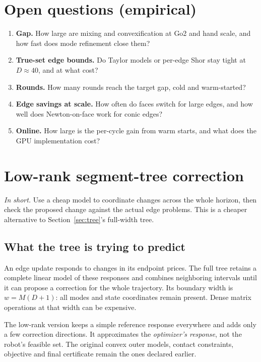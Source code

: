 \documentclass[11pt]{article}
\theoremstyle{plain}
\theoremstyle{definition}
\theoremstyle{remark}
\begin{document}
\section{Open questions (empirical)}
\begin{enumerate}[label=\textbf{Q\arabic*.},leftmargin=2em]
  \item \textbf{Gap.} How large are mixing and convexification at Go2 and hand scale, and how fast does mode refinement close them?
  \item \textbf{True-set edge bounds.} Do Taylor models or per-edge Shor stay tight at $D\approx40$, and at what cost?
  \item \textbf{Rounds.} How many rounds reach the target gap, cold and warm-started?
  \item \textbf{Edge savings at scale.} How often do faces switch for large edges, and how well does Newton-on-face work for conic edges?
  \item \textbf{Online.} How large is the per-cycle gain from warm starts, and what does the GPU implementation cost?
\end{enumerate}

\section{Low-rank segment-tree correction}\label{sec:lowrank}
\textit{In short.} Use a cheap model to coordinate changes across the whole horizon, then check the proposed change against the actual edge problems. This is a cheaper alternative to Section~\ref{sec:tree}'s full-width tree.

\subsection{What the tree is trying to predict}
An edge update responds to changes in its endpoint prices. The full tree retains a complete linear model of these responses and combines neighboring intervals until it can propose a correction for the whole trajectory. Its boundary width is $w=M(D+1)$: all modes and state coordinates remain present. Dense matrix operations at that width can be expensive.

The low-rank version keeps a simple reference response everywhere and adds only a few correction directions. It approximates the \emph{optimizer's response}, not the robot's feasible set. The original convex outer models, contact constraints, objective and final certificate remain the ones declared earlier.
\end{document}
